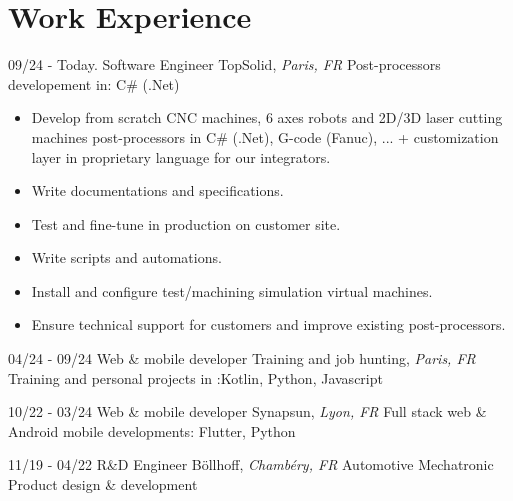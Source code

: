 \documentclass[]{friggeri-cv}
\begin{document}
\section{Work Experience}
\vspace*{-0.25cm}

\begin{entrylist}
  \entry
    {09/24 - Today.}
    {Software Engineer}
    {TopSolid, \textit{Paris, FR}}
    {Post-processors developement in: C\# (.Net)}
\end{entrylist}
\vspace{-15pt}

\vspace{0.5mm}
\begin{itemize}
\setlength{\itemsep}{1pt}
\setlength{\parskip}{0pt}
\setlength{\parsep}{0pt}

\item Develop from scratch CNC machines, 6 axes robots and 2D/3D laser cutting machines post-processors in C\# (.Net), G-code (Fanuc), ... + customization layer in proprietary language for our integrators.
\item Write documentations and specifications.
\item Test and fine-tune in production on customer site.
\item Write scripts and automations.
\item Install and configure test/machining simulation virtual machines.
\item Ensure technical support for customers and improve existing post-processors.
\end{itemize}

\begin{entrylist}
  \entry
    {04/24 - 09/24}
    {Web \& mobile developer}
    {Training and job hunting, \textit{Paris, FR}}
    {Training and personal projects in :\hspace*{8mm}Kotlin, Python, Javascript}
\end{entrylist}

\begin{entrylist}
  \entry
    {10/22 - 03/24}
    {Web \& mobile developer}
    {Synapsun, \textit{Lyon, FR}}
    {Full stack web \& Android mobile developments: \hspace*{8mm}Flutter, Python}
\end{entrylist}

\begin{entrylist}
  \entry
    {11/19 - 04/22}
    {R\&D Engineer}
    {Böllhoff, \textit{Chambéry, FR}}
    {Automotive Mechatronic Product design \& development}
\end{entrylist}
\end{document}
